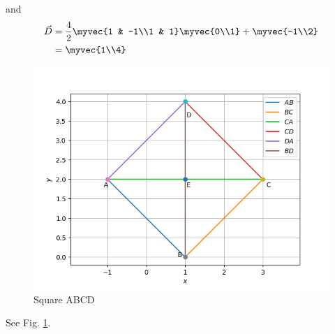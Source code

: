and 
\begin{align}
	\vec{D} &= \frac{4}{2}\myvec{1 & -1\\1 & 1} \myvec{0\\1}+ \myvec{-1\\2}
	\\
	&=\myvec{1\\4}
\end{align}
\begin{figure}[!ht]
	\centering
	\includegraphics[width= \columnwidth]{solutions/1/6/quad.png}
\caption{Square ABCD}
\label{fig:2.2.7}
\end{figure}
See Fig. \ref{fig:2.2.7}.



